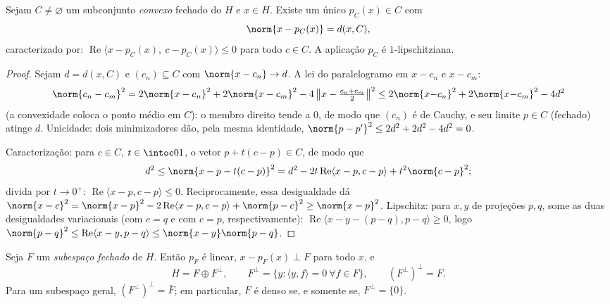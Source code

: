 \begin{theorem}
\label{thm:b3:hilbert:projection}
Sejam $C \neq \varnothing$ um subconjunto \emph{convexo} fechado do 
$H$ e $x \in H$. Existe um único $p_C(x)
\in C$ com
\[
\norm{x - p_C(x)} = d(x, C),
\]
caracterizado por: $\operatorname{Re}\langle x - p_C(x),\ c -
p_C(x)\rangle \leq 0$ para todo $c \in C$. A aplicação $p_C$ é
$1$-lipschitziana.
\end{theorem}

\begin{proof}
Sejam $d = d(x, C)$ e $(c_n) \subseteq C$ com $\norm{x - c_n}
\to d$. A lei do paralelogramo em $x - c_n$ e $x - c_m$:
\[
\norm{c_n - c_m}^2 = 2\norm{x - c_n}^2 + 2\norm{x - c_m}^2 -
4\,\bigl\|x - \tfrac{c_n + c_m}2\bigr\|^2
\leq 2\norm{x{-}c_n}^2 + 2\norm{x{-}c_m}^2 - 4d^2
\]
(a convexidade coloca o ponto médio em $C$): o membro direito tende a
$0$, de modo que $(c_n)$ é de Cauchy, e seu limite $p \in C$ (fechado)
atinge $d$. Unicidade: dois minimizadores dão, pela mesma
identidade, $\norm{p - p'}^2 \leq 2d^2 + 2d^2 - 4d^2 = 0$.

Caracterização: para $c \in C$, $t \in \intoc01$, o vetor $p + t(c - p) \in C$, de modo que
\[
d^2 \leq \norm{x - p - t(c-p)}^2
= d^2 - 2t\operatorname{Re}\langle x - p, c - p\rangle +
t^2\norm{c-p}^2 ;
\]
divida por $t \to 0^+$: $\operatorname{Re}\langle x - p, c -
p\rangle \leq 0$. Reciprocamente, essa desigualdade dá $\norm{x -
c}^2 = \norm{x - p}^2 - 2\operatorname{Re}\langle x - p, c -
p\rangle + \norm{p - c}^2 \geq \norm{x-p}^2$.
Lipschitz: para $x, y$ de projeções $p, q$, some as duas
desigualdades variacionais (com $c = q$ e com $c = p$,
respectivamente): $\operatorname{Re}\langle x - y - (p - q), p - q\rangle \geq
0$, logo $\norm{p - q}^2 \leq \operatorname{Re}\langle x - y, p -
q\rangle \leq \norm{x - y}\norm{p - q}$.
\end{proof}

\begin{theorem}
\label{thm:b3:hilbert:decomposition}
Seja $F$ um \emph{subespaço fechado} de $H$. Então $p_F$ é
linear, $x - p_F(x) \perp F$ para todo $x$, e
\[
H = F \oplus F^\perp,
\qquad F^\perp = \{y : \langle y, f\rangle = 0\ \forall f\in
F\},
\qquad (F^\perp)^\perp = F .
\]
Para um subespaço geral, $(F^\perp)^\perp = \bar F$; em particular, $F$ é denso se, e
somente se, $F^\perp = \{0\}$.
\end{theorem}

